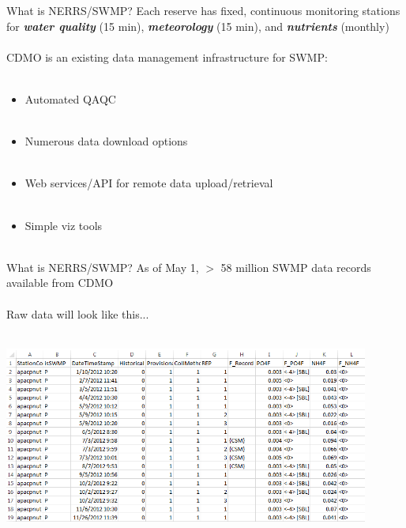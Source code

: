 \documentclass[serif]{beamer}\usepackage[]{graphicx}\usepackage[]{color}
\newcommand{\Bigtxt}[1]{\textbf{\textit{#1}}}
\begin{document}
\begin{frame}{What is NERRS/SWMP?}
Each reserve has fixed, continuous monitoring stations for \Bigtxt{water quality} (15 min), \Bigtxt{meteorology} (15 min), and \Bigtxt{nutrients} (monthly)\\~\\
CDMO is an existing data management infrastructure for SWMP:\\~\\
\begin{itemize}
\item Automated QAQC \\~\\
\item Numerous data download options \\~\\
\item Web services/API for remote data upload/retrieval \\~\\
\item Simple viz tools \\~\\
\end{itemize}
\end{frame}

\begin{frame}[t]{What is NERRS/SWMP?}
As of May 1, $>$ 58 million SWMP data records available from CDMO\\~\\
Raw data will look like this...\\~\\
\centerline{\includegraphics[width = 0.9\textwidth]{fig/qaqc_ex.png}}
\end{frame}
\end{document}
